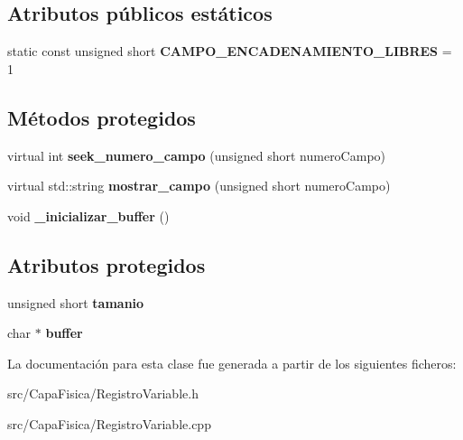 \subsection*{\-Atributos públicos estáticos}
\begin{DoxyCompactItemize}
\item 
\hypertarget{class_registro_variable_a52ee0a1ae71cd22ced355da6537e1727}{static const unsigned short {\bfseries \-C\-A\-M\-P\-O\-\_\-\-E\-N\-C\-A\-D\-E\-N\-A\-M\-I\-E\-N\-T\-O\-\_\-\-L\-I\-B\-R\-E\-S} = 1}\label{class_registro_variable_a52ee0a1ae71cd22ced355da6537e1727}

\end{DoxyCompactItemize}
\subsection*{\-Métodos protegidos}
\begin{DoxyCompactItemize}
\item 
\hypertarget{class_registro_variable_aabdffc1ec7fad03c75940185e2996055}{virtual int {\bfseries seek\-\_\-numero\-\_\-campo} (unsigned short numero\-Campo)}\label{class_registro_variable_aabdffc1ec7fad03c75940185e2996055}

\item 
\hypertarget{class_registro_variable_a8d0b3e80688a27e90fc1a8503388a421}{virtual std\-::string {\bfseries mostrar\-\_\-campo} (unsigned short numero\-Campo)}\label{class_registro_variable_a8d0b3e80688a27e90fc1a8503388a421}

\item 
\hypertarget{class_registro_variable_a98ceeba9c9d220d7158edc9a02d255ba}{void {\bfseries \-\_\-inicializar\-\_\-buffer} ()}\label{class_registro_variable_a98ceeba9c9d220d7158edc9a02d255ba}

\end{DoxyCompactItemize}
\subsection*{\-Atributos protegidos}
\begin{DoxyCompactItemize}
\item 
\hypertarget{class_registro_variable_a977ae3ed16bf4648f9d4ceba4839a18b}{unsigned short {\bfseries tamanio}}\label{class_registro_variable_a977ae3ed16bf4648f9d4ceba4839a18b}

\item 
\hypertarget{class_registro_variable_ab53627ffc6dea6e68394f9367cdf5634}{char $\ast$ {\bfseries buffer}}\label{class_registro_variable_ab53627ffc6dea6e68394f9367cdf5634}

\end{DoxyCompactItemize}


\-La documentación para esta clase fue generada a partir de los siguientes ficheros\-:\begin{DoxyCompactItemize}
\item 
src/\-Capa\-Fisica/\-Registro\-Variable.\-h\item 
src/\-Capa\-Fisica/\-Registro\-Variable.\-cpp\end{DoxyCompactItemize}
